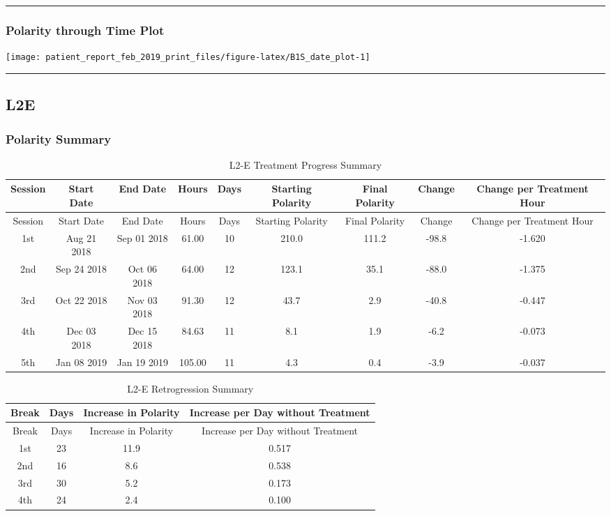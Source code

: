 \documentclass[]{article}
\begin{document}
\begin{center}\rule{0.5\linewidth}{\linethickness}\end{center}

\subsubsection{Polarity through Time
Plot}\label{polarity-through-time-plot-1}

\texttt{[image: patient\_report\_feb\_2019\_print\_files/figure-latex/B1S\_date\_plot-1]}

\begin{center}\rule{0.5\linewidth}{\linethickness}\end{center}

\subsection{L2E}\label{l2e}

\subsubsection{Polarity Summary}\label{polarity-summary-2}

\begin{longtable}[]{@{}ccccccccc@{}}
\caption{L2-E Treatment Progress Summary}\tabularnewline
\toprule
Session & Start Date & End Date & Hours & Days & Starting Polarity &
Final Polarity & Change & Change per Treatment Hour\tabularnewline
\midrule
\endfirsthead
\toprule
Session & Start Date & End Date & Hours & Days & Starting Polarity &
Final Polarity & Change & Change per Treatment Hour\tabularnewline
\midrule
\endhead
1st & Aug 21 2018 & Sep 01 2018 & 61.00 & 10 & 210.0 & 111.2 & -98.8 &
-1.620\tabularnewline
2nd & Sep 24 2018 & Oct 06 2018 & 64.00 & 12 & 123.1 & 35.1 & -88.0 &
-1.375\tabularnewline
3rd & Oct 22 2018 & Nov 03 2018 & 91.30 & 12 & 43.7 & 2.9 & -40.8 &
-0.447\tabularnewline
4th & Dec 03 2018 & Dec 15 2018 & 84.63 & 11 & 8.1 & 1.9 & -6.2 &
-0.073\tabularnewline
5th & Jan 08 2019 & Jan 19 2019 & 105.00 & 11 & 4.3 & 0.4 & -3.9 &
-0.037\tabularnewline
\bottomrule
\end{longtable}

\begin{longtable}[]{@{}cccc@{}}
\caption{L2-E Retrogression Summary}\tabularnewline
\toprule
Break & Days & Increase in Polarity & Increase per Day without
Treatment\tabularnewline
\midrule
\endfirsthead
\toprule
Break & Days & Increase in Polarity & Increase per Day without
Treatment\tabularnewline
\midrule
\endhead
1st & 23 & 11.9 & 0.517\tabularnewline
2nd & 16 & 8.6 & 0.538\tabularnewline
3rd & 30 & 5.2 & 0.173\tabularnewline
4th & 24 & 2.4 & 0.100\tabularnewline
\bottomrule
\end{longtable}
\end{document}
